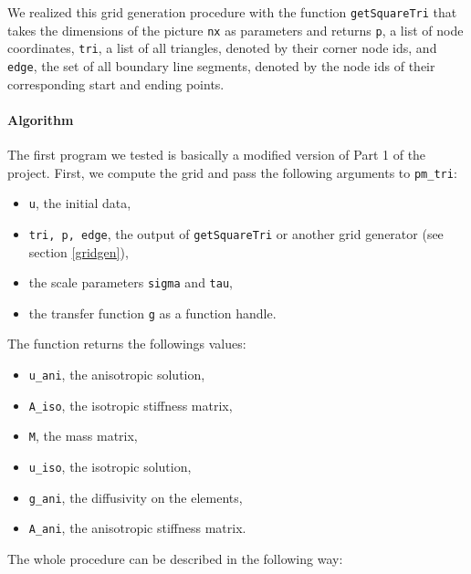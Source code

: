 \documentclass{report}
\begin{document}
We realized this grid generation procedure with the function \texttt{getSquareTri} that takes the dimensions of the picture \texttt{nx} as parameters and returns \texttt{p}, a list of node coordinates, \texttt{tri}, a list of all triangles, denoted by their corner node ids, and \texttt{edge}, the set of all boundary line segments, denoted by the node ids of their corresponding start and ending points.

\paragraph{Algorithm}

The first program we tested is basically a modified version of Part 1 of the project. First, we compute the grid and pass the following arguments to \texttt{pm\_tri}:
\begin{itemize}
    \item
    \texttt{u}, the initial data,
    
    \item 
    \texttt{tri, p, edge}, the output of \texttt{getSquareTri} or another grid generator (see section
     \ref{gridgen}),
     
    \item
    the scale parameters \texttt{sigma} and \texttt{tau},
    
    \item
    the transfer function \texttt{g} as a function handle.
\end{itemize}
The function returns the followings values:
\begin{itemize}
    \item 
    \texttt{u\_ani}, the anisotropic solution,
    \item
    \texttt{A\_iso}, the isotropic stiffness matrix,
    \item
    \texttt{M}, the mass matrix,
    \item
    \texttt{u\_iso}, the isotropic solution,
    \item
    \texttt{g\_ani}, the diffusivity on the elements,
    \item
    \texttt{A\_ani}, the anisotropic stiffness matrix.
\end{itemize}
The whole procedure can be described in the following way:
\end{document}
